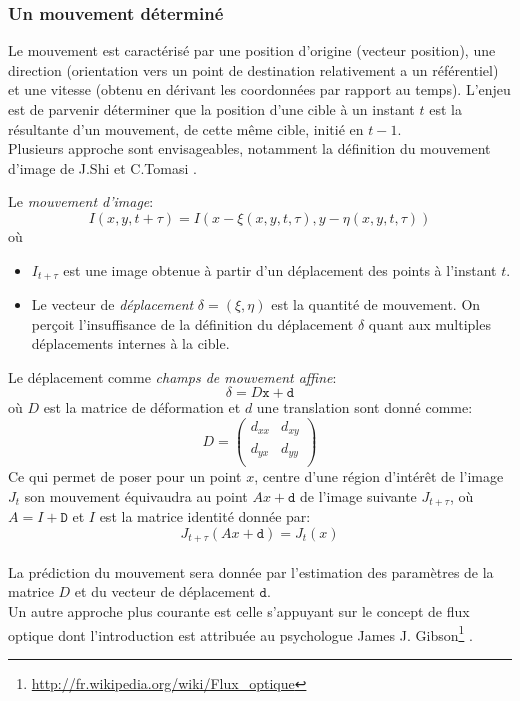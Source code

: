\documentclass[a4paper,11pt]{report}
\begin{document}
\subsubsection{Un mouvement déterminé}		
	Le mouvement est caractérisé par une position d'origine (vecteur position), une direction (orientation vers un point de destination relativement a un référentiel) et une vitesse (obtenu en dérivant les coordonnées par rapport au temps).	
	L'enjeu est de parvenir déterminer que la position d'une cible à un instant $t$ est la résultante d'un mouvement, de cette même cible, initié en $t-1$.\\
	
	Plusieurs approche sont envisageables, notamment la définition du mouvement d'image de J.Shi et C.Tomasi .
	
	Le \textit{mouvement d'image}:
	$$I(x,y,t+\tau)=I(x-\xi(x,y,t,\tau),y-\eta(x,y,t,\tau))$$
	où
	\begin{itemize}
	\item[] $I_{t+\tau}$ est une image obtenue à partir d'un déplacement des points à l'instant $t$.
	\item[] Le vecteur de \textit{déplacement} $\delta = (\xi,\eta)$ est la quantité de mouvement. On perçoit l'insuffisance de la définition du déplacement $\delta$ quant aux multiples déplacements internes à la cible.\\
	\end{itemize}
	Le déplacement comme \textit{champs de mouvement affine}:
	$$\delta = D\texttt{x}+\texttt{d}$$
	où
	$D$ est la matrice de déformation et $d$ une translation sont donné comme:
	$$ D = \left( 
		\begin{array}{cc}
		d_{xx} & d_{xy} \\
		d_{yx} & d_{yy} \\ 
		\end{array} 
		   \right)
	$$
	Ce qui permet de poser pour un point $x$, centre d'une région d'intérêt de l'image $J_t$ son mouvement équivaudra au point $Ax + \texttt{d}$ de l'image suivante $J_{t+\tau}$, où $A = I + \texttt{D}$ et $I$ est la matrice identité donnée par:$$J_{t+\tau}(Ax + \texttt{d}) = J_t(x)$$\\
	La prédiction du mouvement sera donnée par l'estimation des paramètres de la matrice $D$ et du vecteur de déplacement $\texttt{d}$.\\
	
	
	
	Un autre approche plus courante est celle s'appuyant sur le concept de flux optique dont l'introduction est attribuée au psychologue James J. Gibson\footnote{\url{http://fr.wikipedia.org/wiki/Flux_optique}} . 
	
\end{document}
